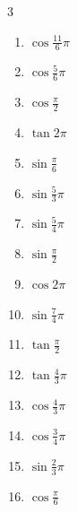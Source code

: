 \begin{multicols}{3}
\begin{enumerate}
  \item $\displaystyle \cos{\frac{11}{6}\pi}$

  \item $\displaystyle \cos{\frac{5}{6}\pi}$

  \item $\displaystyle \cos{\frac{\pi}{2}}$
        \phantom{$\displaystyle =0$}

  \item $\displaystyle \tan{2\pi}$
        \phantom{$\displaystyle =0$}

  \item $\displaystyle \sin{\frac{\pi}{6}}$

  \item $\displaystyle \sin{\frac{5}{3}\pi}$

  \item $\displaystyle \sin{\frac{5}{4}\pi}$

  \item $\displaystyle \sin{\frac{\pi}{2}}$
        \phantom{$\displaystyle =1$}

  \item $\displaystyle \cos{2\pi}$
        \phantom{$\displaystyle =1$}

  \item $\displaystyle \sin{\frac{7}{4}\pi}$

  \item $\displaystyle \tan{\frac{\pi}{2}}$
        \phantom{$\displaystyle \quad なし$}

  \item $\displaystyle \tan{\frac{4}{3}\pi}$

  \item $\displaystyle \cos{\frac{4}{3}\pi}$

  \item $\displaystyle \cos{\frac{3}{4}\pi}$

  \item $\displaystyle \sin{\frac{2}{3}\pi}$

  \item $\displaystyle \cos{\frac{\pi}{6}}$


\end{enumerate}
\end{multicols}
